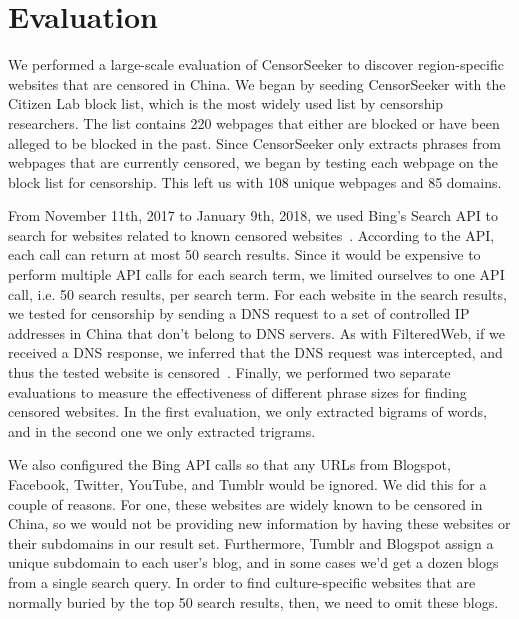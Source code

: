 

\section{Evaluation}

We performed a large-scale evaluation of CensorSeeker to
discover region-specific websites that are censored in China.  We
began by seeding CensorSeeker with the Citizen Lab block list, which is
the most widely used list by censorship researchers. The list contains
220 webpages that either are blocked or have been alleged to be blocked in
the past. Since CensorSeeker only extracts phrases from webpages that are
currently censored, we began by testing each webpage on the block list for
censorship. This left us with 108 unique webpages and 85 domains.

From November 11th, 2017 to January 9th, 2018, we used Bing's Search
API to search for websites related to known censored
websites~\cite{microsoft:bing}. According to the API, each call can
return at most 50 search results. Since it would be expensive to
perform multiple API calls for each search term, we limited ourselves
to one API call, i.e. 50 search results, per search term. For 
each website in the search results, we tested for censorship by
sending a DNS request to a set of controlled IP addresses in China
that don't belong to DNS servers. As with FilteredWeb, if we
received a DNS response, we inferred that the DNS request was
intercepted, and thus the tested website is
censored~\cite{darer2017filteredweb}. Finally, we performed two
separate evaluations to measure the effectiveness of different phrase
sizes for finding censored websites. In the first evaluation, we only
extracted bigrams of words, and in the second one we only extracted
trigrams.

We also configured the Bing API calls so that any URLs from Blogspot,
Facebook, Twitter, YouTube, and Tumblr would be ignored. We did this
for a couple of reasons. For one, these websites are widely known to
be censored in China, so we would not be providing new information by
having these websites or their subdomains in our result
set. Furthermore, Tumblr and Blogspot assign a unique subdomain to
each user's blog, and in some cases we'd get a dozen blogs from a
single search query. In order to find culture-specific websites that
are normally buried by the top 50 search results, then, we need to
omit these blogs.